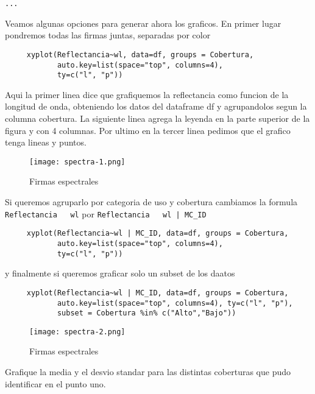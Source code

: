 \begin{exa}
\begin{Verbatim}[fontsize=\small]
     ...
     \end{Verbatim}
     Veamos algunas opciones para generar ahora los graficos. En primer lugar
     pondremos todas las firmas juntas, separadas por color
     \begin{lstlisting}
     xyplot(Reflectancia~wl, data=df, groups = Cobertura,
            auto.key=list(space="top", columns=4), 
            ty=c("l", "p"))
     \end{lstlisting}
     Aqui la primer linea dice que grafiquemos la reflectancia como funcion de
     la longitud de onda, obteniendo los datos del dataframe df y agrupandolos
     segun la columna cobertura. La siguiente linea agrega la leyenda en la
     parte superior de la figura y con 4 columnas. Por ultimo en la tercer linea
     pedimos que el grafico tenga lineas y puntos.
     \begin{figure}
     \begin{center}
         \texttt{[image: spectra-1.png]}
     \end{center}
     \caption{Firmas espectrales}
     \label{fig:spectra-1}
     \end{figure}
     Si queremos agruparlo por categoria de uso y cobertura cambiamos la formula
     \texttt{Reflectancia ~ wl} por \texttt{Reflectancia ~ wl | MC\_ID}
     \begin{lstlisting}
     xyplot(Reflectancia~wl | MC_ID, data=df, groups = Cobertura,
            auto.key=list(space="top", columns=4), 
            ty=c("l", "p"))
     \end{lstlisting}
     y finalmente si queremos graficar solo un subset de los daatos
     \begin{lstlisting}
     xyplot(Reflectancia~wl | MC_ID, data=df, groups = Cobertura,
            auto.key=list(space="top", columns=4), ty=c("l", "p"),
            subset = Cobertura %in% c("Alto","Bajo"))
     \end{lstlisting}
     \begin{figure}
     \begin{center}
         \texttt{[image: spectra-2.png]}
     \end{center}
     \caption{Firmas espectrales}
     \label{fig:spectra-1}
     \end{figure}
 \end{exa}

\begin{act}
    Grafique la media y el desvio standar para las distintas coberturas que pudo
     identificar en el punto uno. 
\end{act}
